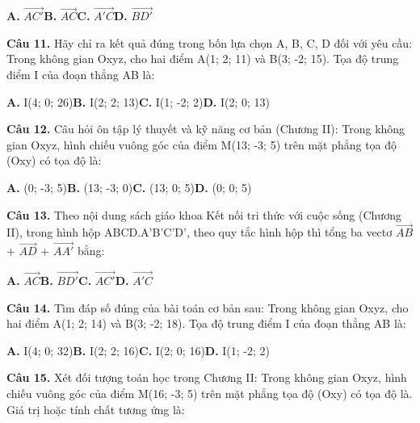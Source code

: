 \documentclass[11pt,a4paper]{article}
\begin{document}
\hspace*{1.5em}\textbf{A.} $\overrightarrow{AC'}$\quad\quad \textbf{B.} $\overrightarrow{AC}$\quad\quad \textbf{C.} $\overrightarrow{A'C}$\quad\quad \textbf{D.} $\overrightarrow{BD'}$\par\vspace{2pt}
\textbf{\color{primary} Câu 11.} Hãy chỉ ra kết quả đúng trong bốn lựa chọn A, B, C, D đối với yêu cầu: Trong không gian Oxyz, cho hai điểm A(1; 2; 11) và B(3; -2; 15). Tọa độ trung điểm I của đoạn thẳng AB là:\par
\hspace*{1.5em}\textbf{A.} I(4; 0; 26)\quad\quad \textbf{B.} I(2; 2; 13)\quad\quad \textbf{C.} I(1; -2; 2)\quad\quad \textbf{D.} I(2; 0; 13)\par\vspace{2pt}
\textbf{\color{primary} Câu 12.} Câu hỏi ôn tập lý thuyết và kỹ năng cơ bản (Chương II): Trong không gian Oxyz, hình chiếu vuông góc của điểm M(13; -3; 5) trên mặt phẳng tọa độ (Oxy) có tọa độ là:\par
\hspace*{1.5em}\textbf{A.} (0; -3; 5)\quad\quad \textbf{B.} (13; -3; 0)\quad\quad \textbf{C.} (13; 0; 5)\quad\quad \textbf{D.} (0; 0; 5)\par\vspace{2pt}
\textbf{\color{primary} Câu 13.} Theo nội dung sách giáo khoa Kết nối tri thức với cuộc sống (Chương II), trong hình hộp ABCD.A'B'C'D', theo quy tắc hình hộp thì tổng ba vectơ $\overrightarrow{AB}$ + $\overrightarrow{AD}$ + $\overrightarrow{AA'}$ bằng:\par
\hspace*{1.5em}\textbf{A.} $\overrightarrow{AC}$\quad\quad \textbf{B.} $\overrightarrow{BD'}$\quad\quad \textbf{C.} $\overrightarrow{AC'}$\quad\quad \textbf{D.} $\overrightarrow{A'C}$\par\vspace{2pt}
\textbf{\color{primary} Câu 14.} Tìm đáp số đúng của bài toán cơ bản sau: Trong không gian Oxyz, cho hai điểm A(1; 2; 14) và B(3; -2; 18). Tọa độ trung điểm I của đoạn thẳng AB là:\par
\hspace*{1.5em}\textbf{A.} I(4; 0; 32)\quad\quad \textbf{B.} I(2; 2; 16)\quad\quad \textbf{C.} I(2; 0; 16)\quad\quad \textbf{D.} I(1; -2; 2)\par\vspace{2pt}
\textbf{\color{primary} Câu 15.} Xét đối tượng toán học trong Chương II: Trong không gian Oxyz, hình chiếu vuông góc của điểm M(16; -3; 5) trên mặt phẳng tọa độ (Oxy) có tọa độ là. Giá trị hoặc tính chất tương ứng là:\par
\end{document}
